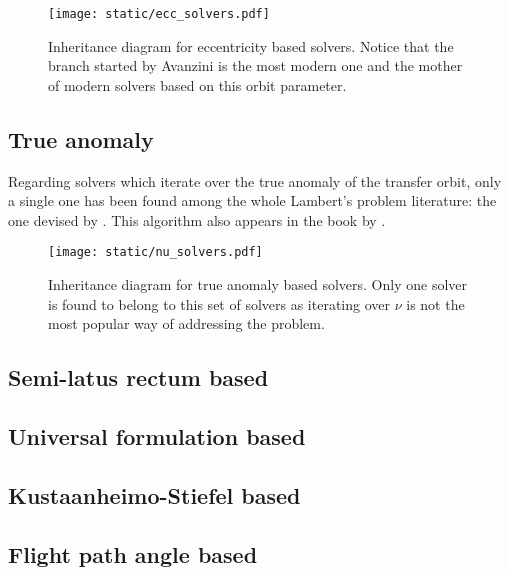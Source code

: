 \vspace{0.5cm}
\begin{figure}[h]
  \centering
  \texttt{[image: static/ecc\_solvers.pdf]}
  \caption{Inheritance diagram for eccentricity based solvers. Notice that the
  branch started by Avanzini is the most modern one and the mother of modern
  solvers based on this orbit parameter.}
  \label{fig:a_solvers}
\end{figure}

\subsection{True anomaly}

Regarding solvers which iterate over the true anomaly of the transfer orbit,
only a single one has been found among the whole Lambert's problem literature:
the one devised by \cite{gunkel1960}. This algorithm also appears in the book by
\citeauthor{escobal1965}.

\vspace{0.5cm}
\begin{figure}[h]
  \centering
  \texttt{[image: static/nu\_solvers.pdf]}
  \caption{Inheritance diagram for true anomaly based solvers. Only one solver
  is found to belong to this set of solvers as iterating over $\nu$ is not the
  most popular way of addressing the problem.}
  \label{fig:a_solvers}
\end{figure}

\subsection{Semi-latus rectum based}
\subsection{Universal formulation based}
\subsection{Kustaanheimo-Stiefel based}
\subsection{Flight path angle based}
